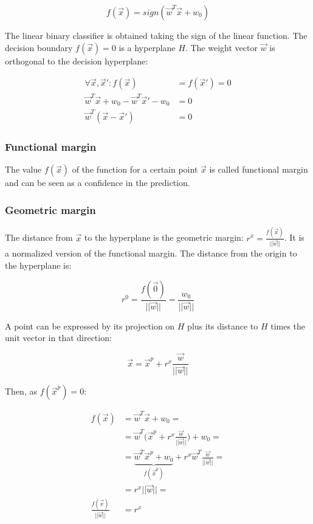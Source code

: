 	$$f(\vec{x}) = sign(\vec{w}^T\vec{x}+w_0)$$

	The linear binary classifier is obtained taking the sign of the linear function.
	The decision boundary $f(\vec{x}) = 0$ is a hyperplane $H$.
	The weight vector $\vec{w}$ is orthogonal to the decision hyperplane:

	\begin{align*}
		\forall\vec{x}, \vec{x}':f(\vec{x})&=f(\vec{x}') = 0\\
		\vec{w}^T\vec{x}+w_0-\vec{w}^T\vec{x}'-w_0 &=0\\
		\vec{w}^T(\vec{x}-\vec{x}') &= 0
	\end{align*}

		\subsubsection{Functional margin}
		The value $f(\vec{x})$ of the function for a certain point $\vec{x}$ is called functional margin and can be seen as a confidence in the prediction.

		\subsubsection{Geometric margin}
		The distance from $\vec{x}$ to the hyperplane is the geometric margin: $r^x = \frac{f(\vec{x})}{||\vec{w}||}$.
		It is a normalized version of the functional margin.
		The distance from the origin to the hyperplane is:

		$$r^0 = \frac{f(\vec{0})}{||\vec{w}||} = \frac{w_0}{||\vec{w}||}$$

		A point can be expressed by its projection on $H$ plus its distance to $H$ times the unit vector in that direction:

		$$\vec{x} = \vec{x}^p + r^x\frac{\vec{w}}{||\vec{w}||}$$

		Then, as $f(\vec{x}^p) = 0$:

		\begin{align*}
			f(\vec{x}) &= \vec{w}^T\vec{x} + w_0=\\
								 &=\vec{w}^T\biggl(\vec{x}^p+r^x\frac{\vec{w}}{||\vec{w}||}\biggr)+w_0=\\
								 &=\underbrace{\vec{w}^T\vec{x}^p+w_0}_{f(\vec{x}^p)}+r^x\vec{w}^T\frac{\vec{w}}{||\vec{w}||}=\\
								 &=r^x||\vec{w}||=\\
			\frac{f(\vec{x})}{||\vec{w}||} & =r^x
		\end{align*}

